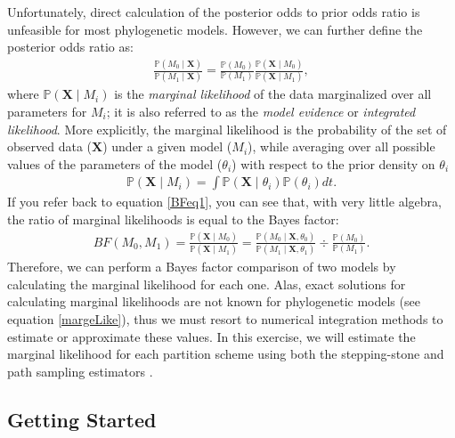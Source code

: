 \documentclass[11pt]{article}
\begin{document}
Unfortunately, direct calculation of the posterior odds to prior odds ratio is unfeasible for most phylogenetic models. However, we can further define the posterior odds ratio as:
\begin{align*}
\frac{\mathbb{P}(M_0 \mid \mathbf X)}{\mathbb{P}(M_1 \mid \mathbf X)} = \frac{\mathbb{P}(M_0)}{\mathbb{P}(M_1)} \frac{\mathbb{P}(\mathbf X \mid M_0)}{\mathbb{P}(\mathbf X \mid M_1)},
\end{align*}
where $\mathbb{P}(\mathbf X \mid M_i)$ is the \textit{marginal likelihood} of the data marginalized over all parameters for $M_i$; it is also referred to as the \textit{model evidence} or \textit{integrated likelihood}.
More explicitly, the marginal likelihood is the probability of the set of observed data ($\mathbf X$) under a given model ($M_i$), while averaging over all possible values of the parameters of the model ($\theta_i$) with respect to the prior density on $\theta_i$
\begin{align}\label{margeLike}
\mathbb{P}(\mathbf X \mid M_i) = \int \mathbb{P}(\mathbf X \mid \theta_i) \mathbb{P}(\theta_i)dt.
\end{align}
If you refer back to equation \ref{BFeq1}, you can see that, with very little algebra, the ratio of marginal likelihoods is equal to the Bayes factor:
\begin{align}\label{bfFormula}
BF(M_0,M_1) = \frac{\mathbb{P}(\mathbf X \mid M_0)}{\mathbb{P}(\mathbf X \mid M_1)} = \frac{\mathbb{P}(M_0 \mid \mathbf X, \theta_0)}{\mathbb{P}(M_1 \mid \mathbf X, \theta_1)} \div \frac{\mathbb{P}(M_0)}{\mathbb{P}(M_1)}. 
\end{align}
Therefore, we can perform a Bayes factor comparison of two models by calculating the marginal likelihood for each one. %
Alas, exact solutions for calculating marginal likelihoods are not known for phylogenetic models (see equation \ref{margeLike}), thus we must resort to numerical integration methods to estimate or approximate these values. 
In this exercise, we will estimate the marginal likelihood for each partition scheme
using both the stepping-stone \citep{xie11} and path sampling estimators \citep{gelman1998,lartillot06, friel2008}. 

\bigskip
\subsection{Getting Started}

\end{document}
